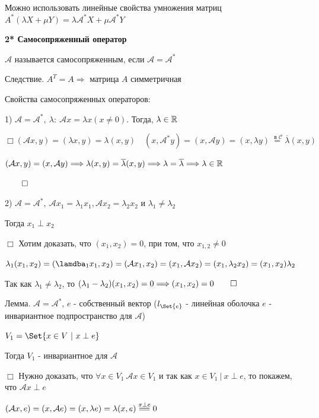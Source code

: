 \documentclass[12pt]{article}
\begin{document}
    Можно использовать линейные свойства умножения матриц $A^* (\lambda X + \mu Y) = \lambda \mathcal{A}^* X + \mu \mathcal{A}^* Y$

    \textbf{2* Самосопряженный оператор}

    \Def $\mathcal{A}$ называется самосопряженным, если $\mathcal{A} = \mathcal{A}^*$

    Следствие. $A^T = A \Longrightarrow$ матрица $A$ симметричная

    Свойства самосопряженных операторов:

    1) $\mathcal{A} = \mathcal{A}^*, \ \lambda : \ \mathcal{A}x = \lambda x (x \neq 0)$. Тогда, $\lambda \in \mathbb{R}$

    $\Box (\mathcal{A}x, y) = (\lambda x, y) = \lambda (x, y) \quad (x, \mathcal{A}^* y) = (x, \mathcal{A}y) = (x, \lambda y) \stackrel{\text{ в } \mathcal{C}}{=} \overline{\lambda} (x, y)$

    $(\mathcal{A}x, y) = (x, \mathcal{A}y) \Longrightarrow \lambda (x, y) = \overline{\lambda} (x, y) \Longrightarrow \lambda = \overline{\lambda} \Longrightarrow \lambda \in \mathbb{R}$

    $\qed$

    2) $\mathcal{A} = \mathcal{A}^*, \ \mathcal{A}x_1 = \lambda_1 x_1, \mathcal{A}x_2 = \lambda_2 x_2$ и $\lambda_1 \neq \lambda_2$

    Тогда $x_1 \perp x_2$

    $\Box$ Хотим доказать, что $(x_1, x_2) = 0$, при том, что $x_{1,2} \neq 0$

    $\lambda_1 (x_1, x_2) = (\lamdba_1 x_1, x_2) = (\mathcal{A} x_1, x_2) = (x_1, \mathcal{A} x_2) = (x_1, \lambda_2 x_2) = (x_1, x_2) \lambda_2$

    Так как $\lambda_1 \neq \lambda_2$, то $(\lambda_1 - \lambda_2) (x_1, x_2) = 0 \Longrightarrow (x_1, x_2) = 0 \qed$

    \Th Лемма. $\mathcal{A} = \mathcal{A}^*$, $e$ - собственный вектор ($l_{\Set{e}}$ - линейная оболочка $e$ - инвариантное подпространство для $\mathcal{A}$)

    $V_1 = \Set{x \in V \ | \ x \perp e}$

    Тогда $V_1$ - инвариантное для $\mathcal{A}$

    $\Box$ Нужно доказать, что $\forall x \in V_1 \ \mathcal{A}x \in V_1$ и так как $x \in V_1 \ | \ x \perp e$, то
    покажем, что $\mathcal{A}x \perp e$

    $(\mathcal{A}x, e) = (x, \mathcal{A}e) = (x, \lambda e) = \lambda (x, e) \stackrel{x \perp e}{=\joinrel=} 0$
\end{document}
